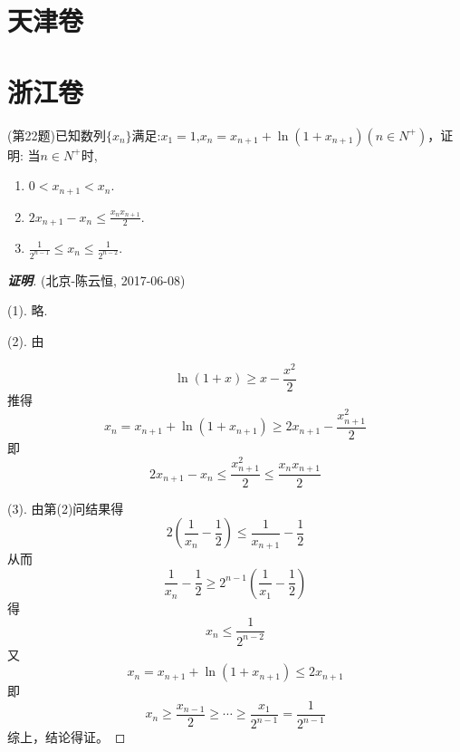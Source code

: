 \documentclass{ctexart}
\begin{document}
\section{天津卷}
\label{sec:tianjin}

\section{浙江卷}
\label{sec:zhejiang}

\begin{exercise}(第22题)已知数列$\{x_n\}$满足:$x_1=1$,$x_n=x_{n+1}+\ln{(1+x_{n+1})}(n \in N^+)$，证明: 当$n \in N^+$时,
  \begin{enumerate}
  \item $0<x_{n+1}<x_n$.
  \item $2x_{n+1}-x_n \leqslant \frac{x_nx_{n+1}}{2}$.
  \item $\frac{1}{2^{n-1}} \leqslant x_n \leqslant \frac{1}{2^{n-2}}$.
  \end{enumerate}
\end{exercise}

\begin{proof}[\textbf{证明}](北京-陈云恒, 2017-06-08)
  
  (1). 略.

  (2). 由
  
  \[ \ln{(1+x)} \geqslant x-\frac{x^2}{2} \]
  推得
  \[ x_n=x_{n+1}+\ln{(1+x_{n+1})} \geqslant 2x_{n+1}-\frac{x_{n+1}^2}{2} \]
  即
   \[ 2x_{n+1}-x_n \leqslant \frac{x_{n+1}^2}{2} \leqslant \frac{x_nx_{n+1}}{2} \]

   (3). 由第(2)问结果得
   \[ 2 \left( \frac{1}{x_n}-\frac{1}{2} \right) \leqslant \frac{1}{x_{n+1}}- \frac{1}{2} \]
   从而
   \[ \frac{1}{x_n}-\frac{1}{2} \geqslant 2^{n-1} \left( \frac{1}{x_1}-\frac{1}{2} \right) \]
   得
   \[ x_n \leqslant \frac{1}{2^{n-2}} \]
   又
   \[ x_n=x_{n+1}+\ln{(1+x_{n+1})} \leqslant 2x_{n+1} \]
   即
   \[ x_n \geqslant \frac{x_{n-1}}{2} \geqslant \cdots \geqslant \frac{x_1}{2^{n-1}} = \frac{1}{2^{n-1}} \]
   综上，结论得证。
\end{proof}
\end{document}
